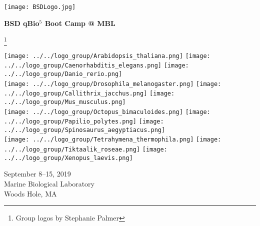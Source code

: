 \documentclass{article}
\newcommand\blfootnote[1]{%
  \begingroup
  \renewcommand\thefootnote{}\footnote{#1}%
  \addtocounter{footnote}{-1}%
  \endgroup
}
\begin{document}
\begin{centering}
\texttt{[image: BSDLogo.jpg]}

\vspace{0.11in}

\Huge{\textbf{BSD qBio$^5$ Boot Camp @ MBL}}

\blfootnote{Group logos by Stephanie Palmer}

\vspace{0.1in}

\texttt{[image: ../../logo\_group/Arabidopsis\_thaliana.png]}
\texttt{[image: ../../logo\_group/Caenorhabditis\_elegans.png]}
\texttt{[image: ../../logo\_group/Danio\_rerio.png]}\\
\texttt{[image: ../../logo\_group/Drosophila\_melanogaster.png]}
\texttt{[image: ../../logo\_group/Callithrix\_jacchus.png]}
\texttt{[image: ../../logo\_group/Mus\_musculus.png]}\\
\texttt{[image: ../../logo\_group/Octopus\_bimaculoides.png]}
\texttt{[image: ../../logo\_group/Papilio\_polytes.png]}
\texttt{[image: ../../logo\_group/Spinosaurus\_aegyptiacus.png]}\\
\texttt{[image: ../../logo\_group/Tetrahymena\_thermophila.png]}
\texttt{[image: ../../logo\_group/Tiktaalik\_roseae.png]}
\texttt{[image: ../../logo\_group/Xenopus\_laevis.png]}

\vspace{0.2in}

\Large{September 8--15, 2019}\\
\Large{Marine Biological Laboratory}\\
\Large{Woods Hole, MA}

\end{centering}
\end{document}
